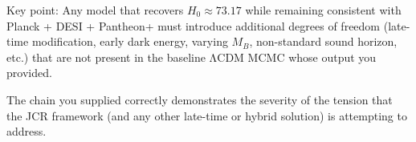 Key point: Any model that recovers \(H_0 \approx 73.17\) while remaining consistent with Planck + DESI + Pantheon+ must introduce additional degrees of freedom (late-time modification, early dark energy, varying \(M_B\), non-standard sound horizon, etc.) that are not present in the baseline ΛCDM MCMC whose output you provided.

The chain you supplied correctly demonstrates the severity of the tension that the JCR framework (and any other late-time or hybrid solution) is attempting to address.
